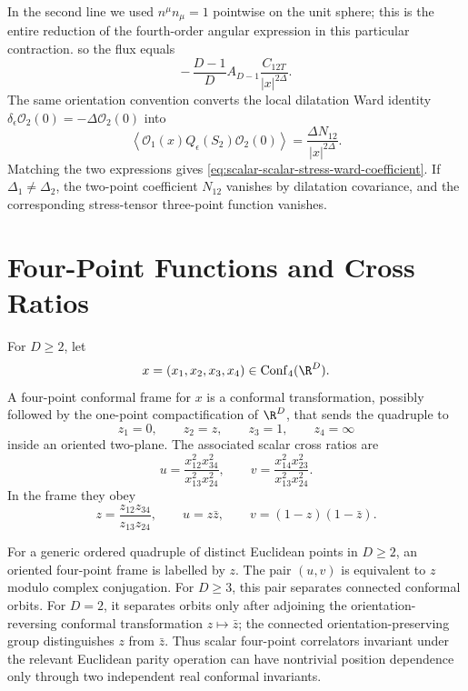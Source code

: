 In the second line we used \(n^\mu n_\mu=1\) pointwise on the unit sphere;
this is the entire reduction of the fourth-order angular expression in this
particular contraction.
so the flux equals
\[
  -\,\frac{D-1}{D}A_{D-1}
  \frac{C_{12T}}{|x|^{2\Delta}}.
\]
The same orientation convention converts the local dilatation Ward identity
\(\delta_\epsilon\mathcal O_2(0)=-\Delta\mathcal O_2(0)\) into
\[
  \left\langle
    \mathcal O_1(x)Q_\epsilon(S_2)\mathcal O_2(0)
  \right\rangle
  =
  \frac{\Delta N_{12}}{|x|^{2\Delta}}.
\]
Matching the two expressions gives
\eqref{eq:scalar-scalar-stress-ward-coefficient}.  If
\(\Delta_1\ne\Delta_2\), the two-point coefficient \(N_{12}\) vanishes by
dilatation covariance, and the corresponding stress-tensor three-point
function vanishes.

\section{Four-Point Functions and Cross Ratios}

\begin{definition}
\label{def:ordered-four-point-conformal-frame}
For \(D\ge2\), let
\[
  x=(x_1,x_2,x_3,x_4)\in\operatorname{Conf}_4(\R^D).
\]
A four-point conformal frame for \(x\) is a conformal transformation, possibly
followed by the one-point compactification of \(\R^D\), that sends the
quadruple to
\[
  z_1=0,\qquad z_2=z,\qquad z_3=1,\qquad z_4=\infty
\]
inside an oriented two-plane.  The associated scalar cross ratios are
\begin{equation}
  u=
  \frac{x_{12}^2x_{34}^2}{x_{13}^2x_{24}^2},
  \qquad
  v=
  \frac{x_{14}^2x_{23}^2}{x_{13}^2x_{24}^2}.
  \label{eq:cross-ratios-u-v}
\end{equation}
In the frame they obey
\[
  z=\frac{z_{12}z_{34}}{z_{13}z_{24}},
  \qquad
  u=z\bar z,\qquad v=(1-z)(1-\bar z).
\]
\end{definition}

\begin{proposition}
\label{prop:four-point-cross-ratio-completeness}
For a generic ordered quadruple of distinct Euclidean points in \(D\ge2\), an
oriented four-point frame is labelled by \(z\).  The pair \((u,v)\) is
equivalent to \(z\) modulo complex conjugation.  For \(D\ge3\), this pair
separates connected conformal orbits.  For \(D=2\), it separates orbits only
after adjoining the orientation-reversing conformal transformation
\(z\mapsto\bar z\); the connected orientation-preserving group distinguishes
\(z\) from \(\bar z\).  Thus scalar four-point correlators invariant under
the relevant Euclidean parity operation can have nontrivial position
dependence only through two independent real conformal invariants.
\end{proposition}

